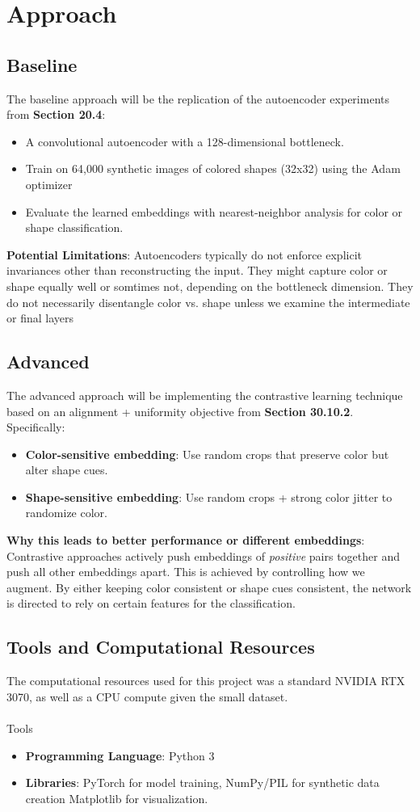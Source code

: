 \documentclass{article}
\begin{document}
\section{Approach}
\subsection{Baseline}
The baseline approach will be the replication of the autoencoder experiments from \textbf{Section 20.4}:
\begin{itemize}
    \item A convolutional autoencoder with a 128-dimensional bottleneck.
    \item Train on 64,000 synthetic images of colored shapes (32x32) using the Adam optimizer
    \item Evaluate the learned embeddings with nearest-neighbor analysis for color or shape classification.
\end{itemize}
\textbf{Potential Limitations}: Autoencoders typically do not enforce explicit invariances other than reconstructing the input.
They might capture color or shape equally well or somtimes not,
depending on the bottleneck dimension.
They do not necessarily disentangle color vs. shape unless we examine the intermediate or final layers
\subsection{Advanced}
The advanced approach will be implementing the contrastive learning technique based on an alignment + uniformity objective from \textbf{Section 30.10.2}.
Specifically:
\begin{itemize}
    \item \textbf{Color-sensitive embedding}: Use random crops that preserve color but alter shape cues.
    \item \textbf{Shape-sensitive embedding}: Use random crops + strong color jitter to randomize color.
\end{itemize}
\textbf{Why this leads to better performance or different embeddings}: 
Contrastive approaches actively push embeddings of \textit{positive} pairs together and push all other embeddings apart.
This is achieved by controlling how we augment. By either keeping color consistent or shape cues consistent,
the network is directed to rely on certain features for the classification.
\subsection{Tools and Computational Resources}
The computational resources used for this project was a standard NVIDIA RTX 3070, as well as a CPU compute given the small dataset.
\\\\
Tools
\begin{itemize}
    \item \textbf{Programming Language}: Python 3
    \item \textbf{Libraries}: PyTorch for model training, NumPy/PIL for synthetic data creation Matplotlib for visualization.
\end{itemize}
\end{document}
